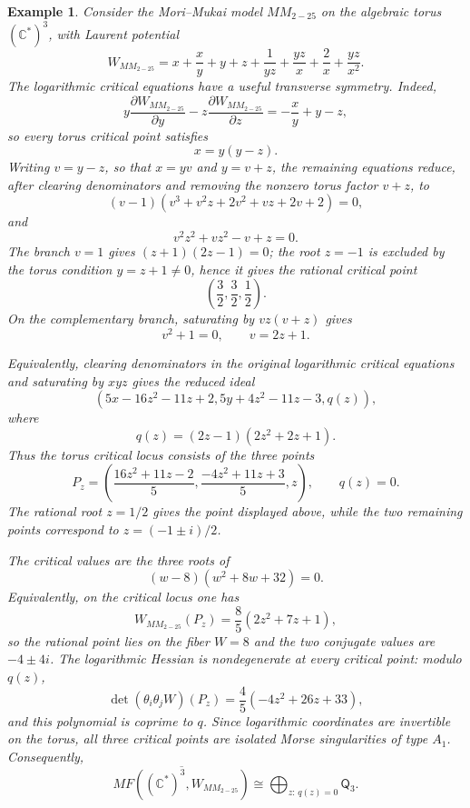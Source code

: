 \documentclass[11pt]{amsart}
\newtheorem{example}{Example}[section]
\newcommand{\MorseCat}[1]{\mathsf{Q}_{#1}}
\begin{document}
\begin{example}
Consider the Mori--Mukai model $MM_{2-25}$ on the algebraic torus
$(\mathbb{C}^*)^3$, with Laurent potential
\[
W_{MM_{2-25}}=x+\frac{x}{y}+y+z+\frac{1}{yz}
+\frac{yz}{x}+\frac{2}{x}+\frac{yz}{x^2}.
\]
The logarithmic critical equations have a useful transverse symmetry. Indeed,
\[
y\frac{\partial W_{MM_{2-25}}}{\partial y}
-z\frac{\partial W_{MM_{2-25}}}{\partial z}
=-\frac{x}{y}+y-z,
\]
so every torus critical point satisfies
\[
x=y(y-z).
\]
Writing $v=y-z$, so that $x=yv$ and $y=v+z$, the remaining equations reduce,
after clearing denominators and removing the nonzero torus factor $v+z$, to
\[
(v-1)(v^3+v^2z+2v^2+vz+2v+2)=0,
\]
and
\[
v^2z^2+vz^2-v+z=0.
\]
The branch $v=1$ gives $(z+1)(2z-1)=0$; the root $z=-1$ is excluded by the
torus condition $y=z+1\neq 0$, hence it gives the rational critical point
\[
\left(\frac{3}{2},\frac{3}{2},\frac{1}{2}\right).
\]
On the complementary branch, saturating by $vz(v+z)$ gives
\[
v^2+1=0,
\qquad
v=2z+1.
\]

Equivalently, clearing denominators in the original logarithmic critical
equations and saturating by $xyz$ gives the reduced ideal
\[
\left(
5x-16z^2-11z+2,
5y+4z^2-11z-3,
q(z)
\right),
\]
where
\[
q(z)=(2z-1)(2z^2+2z+1).
\]
Thus the torus critical locus consists of the three points
\[
P_z=\left(
\frac{16z^2+11z-2}{5},
\frac{-4z^2+11z+3}{5},
z
\right),
\qquad
q(z)=0.
\]
The rational root $z=1/2$ gives the point displayed above, while the two
remaining points correspond to $z=(-1\pm i)/2$.

The critical values are the three roots of
\[
(w-8)(w^2+8w+32)=0.
\]
Equivalently, on the critical locus one has
\[
W_{MM_{2-25}}(P_z)=\frac{8}{5}(2z^2+7z+1),
\]
so the rational point lies on the fiber $W=8$ and the two conjugate values are
$-4\pm 4i$. The logarithmic Hessian is nondegenerate at every critical point:
modulo $q(z)$,
\[
\det(\theta_i\theta_jW)(P_z)=\frac{4}{5}(-4z^2+26z+33),
\]
and this polynomial is coprime to $q$. Since logarithmic coordinates are
invertible on the torus, all three critical points are isolated Morse
singularities of type $A_1$. Consequently,
\[
\overline{MF((\mathbb{C}^*)^3,W_{MM_{2-25}})}
\cong \bigoplus_{z:\,q(z)=0}\MorseCat{3}.
\]
\end{example}
\end{document}
